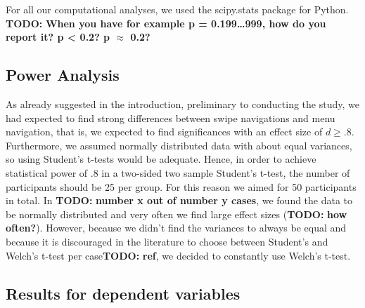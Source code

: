 \documentclass{sig-alternate-05-2015}
\newcommand{\todo}{\textbf{TODO:} \textbf}
\begin{document}
For all our computational analyses, we used the scipy.stats package for Python.
\todo{When you have for example p = 0.199\ldots999, how do you report it? p < 0.2? p $\approx$ 0.2?}
\begin{table}[!h]
\centering
\caption{Comparing burger and swipe for same d}
\label{fig:burger-vs-swipe}
\end{table}
\subsection{Power Analysis}
As already suggested in the introduction, preliminary to conducting the study, we had expected to find strong differences between swipe navigations and menu navigation, that is,
we expected to find significances with an effect size of $d \geq .8$.
Furthermore, we assumed normally distributed data with about equal variances, so using Student's t-tests would be adequate. Hence, in order to achieve statistical power of .8 in a 
two-sided two sample Student's t-test, the number 
of participants should be 25 per group. For this reason we aimed for 50 participants in total. In \todo{number x out of number y cases}, we found the data to be normally distributed and
very often we find large effect sizes (\todo{how often?}). However, because we didn't find the variances to always be equal and because it is discouraged in the literature to
choose between Student's and Welch's t-test per case\todo{ref}, we decided to constantly use Welch's t-test.
\subsection{Results for dependent variables}
\end{document}
